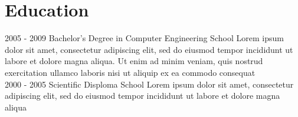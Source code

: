\documentclass[]{friggeri-cv}
\begin{document}
\section{Education}
\begin{entrylist}
  \entry
    {2005 - 2009}
    {Bachelor's Degree in Computer Engineering}
    {School}
    {Lorem ipsum dolor sit amet, consectetur adipiscing elit, sed do eiusmod tempor incididunt ut labore et dolore magna aliqua. Ut enim ad minim veniam, quis nostrud exercitation ullamco laboris nisi ut aliquip ex ea commodo consequat\\}
  \entry
    {2000 - 2005}
    {Scientific Disploma}
    {School}
    {Lorem ipsum dolor sit amet, consectetur adipiscing elit, sed do eiusmod tempor incididunt ut labore et dolore magna aliqua}
\end{entrylist}

\newpage
\end{document}

